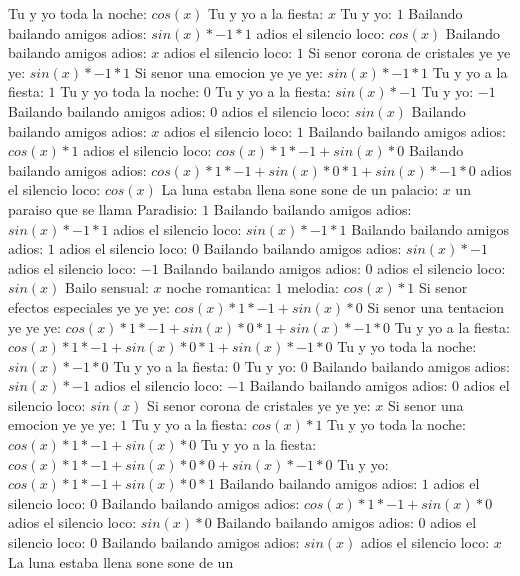 \documentclass{article}
\begin{document}
Tu y yo toda la noche: $cos(x)$  \newline Tu y yo a la fiesta: $x$ Tu y yo: $1$  \newline Bailando bailando amigos adios: $sin(x)*-1*1$ adios el silencio loco: $cos(x)$  \newline Bailando bailando amigos adios: $x$ adios el silencio loco: $1$  \newline Si senor corona de cristales ye ye ye: $sin(x)*-1*1$ Si senor una emocion ye ye ye: $sin(x)*-1*1$ Tu y yo a la fiesta: $1$ Tu y yo toda la noche: $0$  \newline Tu y yo a la fiesta: $sin(x)*-1$ Tu y yo: $-1$ Bailando bailando amigos adios: $0$  \newline adios el silencio loco: $sin(x)$  \newline Bailando bailando amigos adios: $x$ adios el silencio loco: $1$  \newline Bailando bailando amigos adios: $cos(x)*1$ adios el silencio loco: $cos(x)*1*-1+sin(x)*0$ Bailando bailando amigos adios: ${cos(x)*1*-1+sin(x)*0}*1+sin(x)*-1*0$ adios el silencio loco: $cos(x)$  \newline La luna estaba llena sone sone de un palacio: $x$ un paraiso que se llama Paradisio: $1$  \newline Bailando bailando amigos adios: $sin(x)*-1*1$ adios el silencio loco: $sin(x)*-1*1$ Bailando bailando amigos adios: $1$ adios el silencio loco: $0$  \newline Bailando bailando amigos adios: $sin(x)*-1$ adios el silencio loco: $-1$ Bailando bailando amigos adios: $0$  \newline adios el silencio loco: $sin(x)$  \newline Bailo sensual: $x$ noche romantica: $1$  \newline melodia: $cos(x)*1$ Si senor efectos especiales ye ye ye: $cos(x)*1*-1+sin(x)*0$ Si senor una tentacion ye ye ye: ${cos(x)*1*-1+sin(x)*0}*1+sin(x)*-1*0$ Tu y yo a la fiesta: ${cos(x)*1*-1+sin(x)*0}*1+sin(x)*-1*0$  \newline Tu y yo toda la noche: $sin(x)*-1*0$ Tu y yo a la fiesta: $0$ Tu y yo: $0$  \newline Bailando bailando amigos adios: $sin(x)*-1$ adios el silencio loco: $-1$ Bailando bailando amigos adios: $0$  \newline adios el silencio loco: $sin(x)$  \newline Si senor corona de cristales ye ye ye: $x$ Si senor una emocion ye ye ye: $1$  \newline Tu y yo a la fiesta: $cos(x)*1$ Tu y yo toda la noche: $cos(x)*1*-1+sin(x)*0$ Tu y yo a la fiesta: ${cos(x)*1*-1+sin(x)*0}*0+sin(x)*-1*0$ Tu y yo: ${cos(x)*1*-1+sin(x)*0}*1$ Bailando bailando amigos adios: $1$ adios el silencio loco: $0$  \newline Bailando bailando amigos adios: $cos(x)*1*-1+sin(x)*0$  \newline adios el silencio loco: $sin(x)*0$ Bailando bailando amigos adios: $0$ adios el silencio loco: $0$  \newline Bailando bailando amigos adios: $sin(x)$  \newline adios el silencio loco: $x$ La luna estaba llena sone sone de un 
\end{document}
